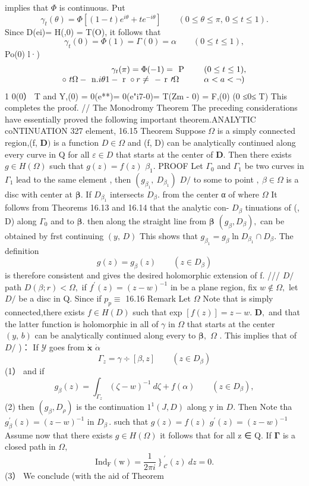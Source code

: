 implies that $\Phi$ is continuous. Put $$ \gamma_{t}(\theta)=\Phi[(1-t)e^{i\theta}+t e^{-i\theta}]\qquad(0\le\theta\le\pi,\,0\le t\le1). $$ Since D(ei)= H(,0) = T(O), it follows that $$ \gamma_{t}(0)=\Phi(1)=\Gamma(0)=\alpha\qquad(0\leq t\leq1), $$ Po(0) l·) $$ \begin{array}{r l}{\gamma_{t}(\pi)=\Phi(-1)=\mathrm{\large~P~}}&{{}\quad(0\leq t\leq1),}\\ {\circ~t\Omega-\mathrm{\large~n}.i\theta1-\mathrm{\boldmath~r~}\circ r\neq\mathrm{\large~-~r~}\prime\Omega\quad}&{{}\quad\alpha<a<\neg)}\end{array} $$ 1 0(0） T and Y,(0) = 0(e**)= 0(e"i7-0)= T(Zm - 0) = F,(0) (0 ≤0≤ T) This completes the proof. // The Monodromy Theorem The preceding considerations have essentially proved the following important theorem.ANALYTIC coNTINUATION 327 element, 16.15 Theorem Suppose $\Omega$ is a simply connected region,(f, ${\boldsymbol{D}})$ is a function $D\in\Omega$ and (f, D) can be analytically continued along every curve in Q for all $\varepsilon\in D$ that starts at the center of ${\boldsymbol{D}}.$ Then there exists $g\in H(\Omega)$ such that $g(z)=f(z)$ $\beta_{1}.$ PROOF Let $\Gamma_{0}$ and ${\Gamma_{1}}$ be two curves in ${\Gamma}_{1}$ lead to the same element , then $(g_{\beta_{1}},\ D_{\beta_{1}})$ $D\!\!\!\!/$ to some to point ${\mathrm{,~}}\beta\in\Omega$ is a disc with center at ${\boldsymbol{\beta}}.$ If $D_{\beta_{1}}$ intersects $D_{\beta}.$ from the center α of where $\Omega$ It follows from Theorems 16.13 and 16.14 that the analytic con- $D_{\beta}$ tinuations of (, D) along ${\Gamma}_{0}$ and to ${\boldsymbol{\beta}}.$ then along the straight line from $\boldsymbol{\beta}$ $(g_{\beta},D_{\beta}),$ can be obtained by frst continuing $\scriptstyle(y,\,D)$ This shows that $g_{\beta_{1}}=g_{\beta}\ln D_{\beta_{1}}\cap D_{\beta}.$ The definition $$ g(z)=g_{\beta}(z)\qquad(z\in D_{\beta}) $$ is therefore consistent and gives the desired holomorphic extension of f. /// $D\!\!\!\!/$ path $D(\beta;r)<\Omega,$ if $f^{\prime}(z)=(z-w)^{-1}$ in be a plane region, fix $w\notin\Omega,$ let $D\!\!\!\!/$ be a disc in Q. Since if $\scriptstyle p_{p}\equiv$ 16.16 Remark Let $\Omega$ Note that is simply connected,there exists $f\in H(D)$ such that exp $[f(z)]=z-w.$ ${\boldsymbol{D}},$ and that the latter function is holomorphic in all of $\scriptstyle\gamma$ in $\Omega$ that starts at the center $\scriptstyle(y,\,b)$ can be analytically continued along every to ${\boldsymbol{\beta}},$ $\Omega$ . This implies that of $D\!\!\!\!/$ )： If $\scriptstyle{\mathcal{Y}}$ goes from $\scriptstyle{\dot{\mathbf{x}}}$ $\scriptstyle{\dot{\alpha}}$ $$ \Gamma_{z}=\gamma\div[\beta,z]\qquad(z\in D_{\beta}) $$ (1） and if $$ g_{\beta}(z)=\int_{{\Gamma}_{z}}(\zeta-w)^{-1}~d\zeta+f(\alpha)\qquad(z\in D_{\beta}), $$ (2) then $(g_{\beta},D_{\rho})$ is the continuation $\scriptstyle1^{1}(J,D)$ along y in $D.$ Then Note tha $g_{\beta}^{\prime}(z)=(z-w)^{-1}$ in $D_{\beta}\,.$ such that $g(z)=f(z)$ $g^{\prime}(z)=(z-w)^{-1}$ Assume now that there exists $g\in H(\Omega)$ it follows that for all z ∈ Q. If $\boldsymbol{\Gamma}$ is a closed path in $\Omega,$ $$ \mathrm{Ind_{F}\left(w\right)=}\frac{1}{2\pi i}\left.\right\}_{\mathcal{C}}^{\prime}(z)\ d z=0. $$ (3） We conclude (with the aid of Theorem 